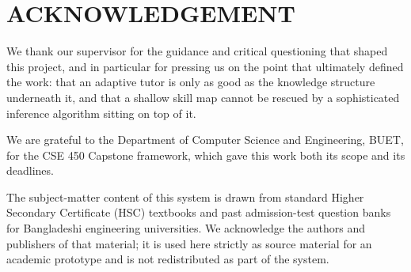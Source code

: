 \chapter*{ACKNOWLEDGEMENT}

We thank our supervisor for the guidance and critical questioning that shaped
this project, and in particular for pressing us on the point that ultimately
defined the work: that an adaptive tutor is only as good as the knowledge
structure underneath it, and that a shallow skill map cannot be rescued by a
sophisticated inference algorithm sitting on top of it.

We are grateful to the Department of Computer Science and Engineering, BUET,
for the CSE 450 Capstone framework, which gave this work both its scope and its
deadlines.

The subject-matter content of this system is drawn from standard Higher
Secondary Certificate (HSC) textbooks and past admission-test question banks
for Bangladeshi engineering universities. We acknowledge the authors and
publishers of that material; it is used here strictly as source material for an
academic prototype and is not redistributed as part of the system.


\clearpage
